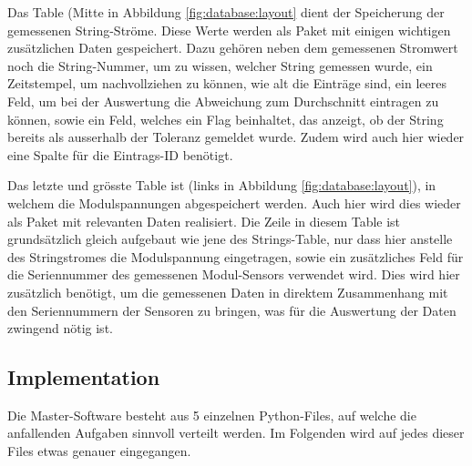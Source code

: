 Das Table   (Mitte in Abbildung  \ref{fig:database:layout} dient
der Speicherung  der gemessenen String-Str\"ome. Diese Werte  werden als Paket
mit einigen  wichtigen zus\"atzlichen Daten gespeichert. Dazu  geh\"oren neben
dem gemessenen Stromwert noch die  String-Nummer, um zu wissen, welcher String
gemessen wurde,  ein Zeitstempel, um  nachvollziehen zu k\"onnen, wie  alt die
Eintr\"age  sind,  ein leeres  Feld,  um  bei  der Auswertung  die  Abweichung
zum  Durchschnitt eintragen  zu k\"onnen,  sowie  ein Feld,  welches ein  Flag
beinhaltet, das  anzeigt, ob  der String bereits  als ausserhalb  der Toleranz
gemeldet wurde. Zudem wird auch hier  wieder eine Spalte f\"ur die Eintrags-ID
ben\"otigt.

Das  letzte  und  gr\"osste  Table   ist    (links  in  Abbildung
\ref{fig:database:layout}),  in  welchem   die  Modulspannungen  abgespeichert
werden. Auch  hier   wird  dies   wieder  als   Paket  mit   relevanten  Daten
realisiert. Die  Zeile in  diesem Table  ist grunds\"atzlich  gleich aufgebaut
wie  jene  des  Strings-Table,  nur   dass  hier  anstelle  des  Stringstromes
die  Modulspannung  eingetragen,  sowie  ein  zus\"atzliches  Feld  f\"ur  die
Seriennummer  des  gemessenen  Modul-Sensors verwendet  wird. Dies  wird  hier
zus\"atzlich ben\"otigt, um die gemessenen Daten in  direktem Zusammenhang mit
den Seriennummern der Sensoren zu bringen,  was f\"ur die Auswertung der Daten
zwingend n\"otig ist.


\subsection{Implementation}
\label{subsec:software:master:implementation}

Die  Master-Software besteht  aus  5 einzelnen  Python-Files,  auf welche  die
anfallenden  Aufgaben sinnvoll  verteilt werden. Im  Folgenden wird  auf jedes
dieser Files etwas genauer eingegangen.


\subsubsection{}
\label{subsubsec:software:master:implementation:database}

